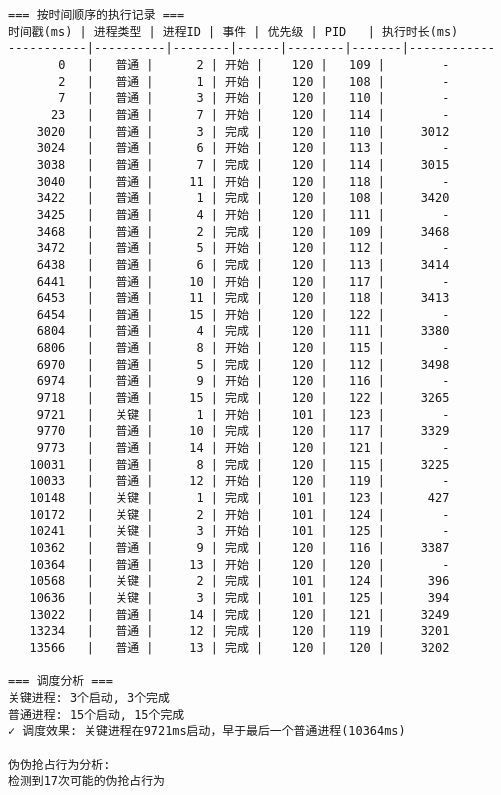 \begin{tcolorbox} [
    enhanced,
    colback=orange!5,
    colframe=orange!40!black,
    leftrule=3mm,
    rightrule=0mm,
    toprule=0mm,
    bottomrule=0mm,
    arc=2mm,
    left=5mm,
    right=5mm,
    top=3mm,
    bottom=3mm,
    fonttitle=\bfseries,
    title=\textbf{调度时序记录示例}
]
\begin{lstlisting}[basicstyle=\footnotesize\fontfamily{zi4}\selectfont, showstringspaces=false]
=== 按时间顺序的执行记录 ===
时间戳(ms) | 进程类型 | 进程ID | 事件 | 优先级 | PID   | 执行时长(ms)
-----------|----------|--------|------|--------|-------|------------
       0   |   普通 |      2 | 开始 |    120 |   109 |        -
       2   |   普通 |      1 | 开始 |    120 |   108 |        -
       7   |   普通 |      3 | 开始 |    120 |   110 |        -
      23   |   普通 |      7 | 开始 |    120 |   114 |        -
    3020   |   普通 |      3 | 完成 |    120 |   110 |     3012
    3024   |   普通 |      6 | 开始 |    120 |   113 |        -
    3038   |   普通 |      7 | 完成 |    120 |   114 |     3015
    3040   |   普通 |     11 | 开始 |    120 |   118 |        -
    3422   |   普通 |      1 | 完成 |    120 |   108 |     3420
    3425   |   普通 |      4 | 开始 |    120 |   111 |        -
    3468   |   普通 |      2 | 完成 |    120 |   109 |     3468
    3472   |   普通 |      5 | 开始 |    120 |   112 |        -
    6438   |   普通 |      6 | 完成 |    120 |   113 |     3414
    6441   |   普通 |     10 | 开始 |    120 |   117 |        -
    6453   |   普通 |     11 | 完成 |    120 |   118 |     3413
    6454   |   普通 |     15 | 开始 |    120 |   122 |        -
    6804   |   普通 |      4 | 完成 |    120 |   111 |     3380
    6806   |   普通 |      8 | 开始 |    120 |   115 |        -
    6970   |   普通 |      5 | 完成 |    120 |   112 |     3498
    6974   |   普通 |      9 | 开始 |    120 |   116 |        -
    9718   |   普通 |     15 | 完成 |    120 |   122 |     3265
    9721   |   关键 |      1 | 开始 |    101 |   123 |        -
    9770   |   普通 |     10 | 完成 |    120 |   117 |     3329
    9773   |   普通 |     14 | 开始 |    120 |   121 |        -
   10031   |   普通 |      8 | 完成 |    120 |   115 |     3225
   10033   |   普通 |     12 | 开始 |    120 |   119 |        -
   10148   |   关键 |      1 | 完成 |    101 |   123 |      427
   10172   |   关键 |      2 | 开始 |    101 |   124 |        -
   10241   |   关键 |      3 | 开始 |    101 |   125 |        -
   10362   |   普通 |      9 | 完成 |    120 |   116 |     3387
   10364   |   普通 |     13 | 开始 |    120 |   120 |        -
   10568   |   关键 |      2 | 完成 |    101 |   124 |      396
   10636   |   关键 |      3 | 完成 |    101 |   125 |      394
   13022   |   普通 |     14 | 完成 |    120 |   121 |     3249
   13234   |   普通 |     12 | 完成 |    120 |   119 |     3201
   13566   |   普通 |     13 | 完成 |    120 |   120 |     3202

=== 调度分析 ===
关键进程: 3个启动, 3个完成
普通进程: 15个启动, 15个完成
✓ 调度效果: 关键进程在9721ms启动，早于最后一个普通进程(10364ms)

伪伪抢占行为分析:
检测到17次可能的伪抢占行为
\end{lstlisting}
\end{tcolorbox}

